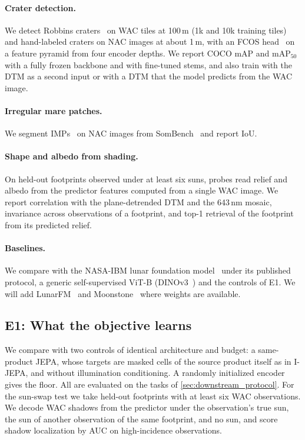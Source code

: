 \paragraph{Crater detection.} We detect Robbins craters~\cite{robbins2019new} on WAC tiles at 100\,m (1k and 10k training tiles) and hand-labeled craters on NAC images at about 1\,m, with an FCOS head~\cite{tian2019fcos} on a feature pyramid from four encoder depths. We report COCO mAP and mAP$_{50}$ with a fully frozen backbone and with fine-tuned stems, and also train with the DTM as a second input or with a DTM that the model predicts from the WAC image.

\paragraph{Irregular mare patches.} We segment IMPs~\cite{braden2014evidence} on NAC images from SomBench~\cite{patil2026sombench} and report IoU.

\paragraph{Shape and albedo from shading.} On held-out footprints observed under at least six suns, probes read relief and albedo from the predictor features computed from a single WAC image. We report correlation with the plane-detrended DTM and the 643\,nm mosaic, invariance across observations of a footprint, and top-1 retrieval of the footprint from its predicted relief.

\paragraph{Baselines.} We compare with the NASA-IBM lunar foundation model~\cite{fraccaro2026multimodal} under its published protocol, a generic self-supervised ViT-B (DINOv3~\cite{simeoni2026dinov3}) and the controls of E1. We will add LunarFM~\cite{gironamata2026lunarfm} and Moonstone~\cite{prasad2026moonstone} where weights are available. 

\subsection{E1: What the objective learns}
\label{sec:e1}

We compare \method with two controls of identical architecture and budget: a same-product JEPA, whose targets are masked cells of the source product itself as in I-JEPA, and \method without illumination conditioning. A randomly initialized encoder gives the floor. All are evaluated on the tasks of \cref{sec:downstream_protocol}. For the sun-swap test we take held-out footprints with at least six WAC observations. We decode WAC shadows from the predictor under the observation's true sun, the sun of another observation of the same footprint, and no sun, and score shadow localization by AUC on high-incidence observations.

